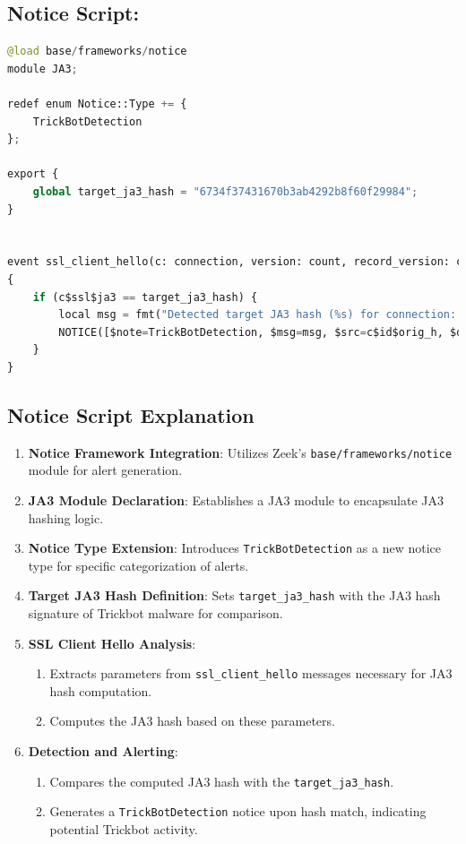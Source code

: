 \subsection{Notice Script:}

\begin{lstlisting}[language=Python, caption=JA3 notice.zeek]
@load base/frameworks/notice
module JA3;

redef enum Notice::Type += {
    TrickBotDetection
};

export {
    global target_ja3_hash = "6734f37431670b3ab4292b8f60f29984"; 
}


event ssl_client_hello(c: connection, version: count, record_version: count, possible_ts: time, client_random: string, session_id: string, ciphers: index_vec, comp_methods: index_vec) &priority=1
{
    if (c$ssl$ja3 == target_ja3_hash) {
        local msg = fmt("Detected target JA3 hash (%s) for connection: %s (Orig: %s, Resp: %s)", target_ja3_hash, c$id, c$id$orig_h, c$id$resp_h);
        NOTICE([$note=TrickBotDetection, $msg=msg, $src=c$id$orig_h, $dst=c$id$resp_h]);
    }
}

\end{lstlisting}

\subsection{Notice Script Explanation}
\begin{enumerate}
    \item \textbf{Notice Framework Integration}: Utilizes Zeek's \texttt{base/frameworks/notice} module for alert generation.
    \item \textbf{JA3 Module Declaration}: Establishes a JA3 module to encapsulate JA3 hashing logic.
    \item \textbf{Notice Type Extension}: Introduces \texttt{TrickBotDetection} as a new notice type for specific categorization of alerts.
    \item \textbf{Target JA3 Hash Definition}: Sets \texttt{target\_ja3\_hash} with the JA3 hash signature of Trickbot malware for comparison.
    \item \textbf{SSL Client Hello Analysis}: 
        \begin{enumerate}
            \item Extracts parameters from \texttt{ssl\_client\_hello} messages necessary for JA3 hash computation.
            \item Computes the JA3 hash based on these parameters.
        \end{enumerate}
    \item \textbf{Detection and Alerting}:
        \begin{enumerate}
            \item Compares the computed JA3 hash with the \texttt{target\_ja3\_hash}.
            \item Generates a \texttt{TrickBotDetection} notice upon hash match, indicating potential Trickbot activity.
        \end{enumerate}
\end{enumerate}

